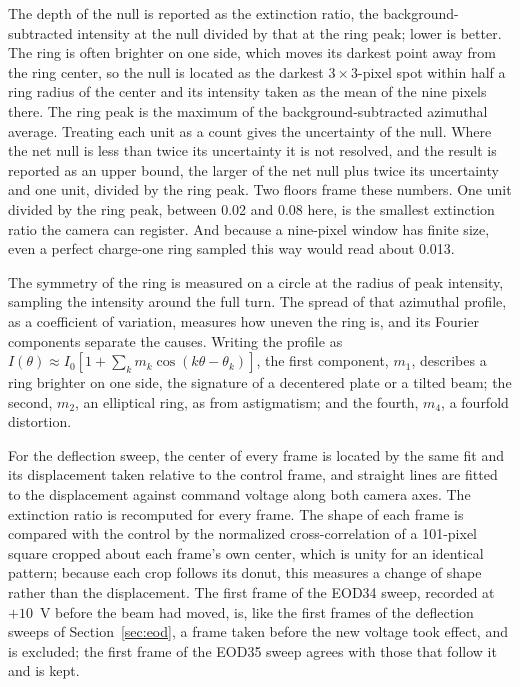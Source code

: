 \documentclass{article}
\begin{document}
The depth of the null is reported as the extinction ratio, the background-subtracted intensity at
the null divided by that at the ring peak; lower is better. The ring is often brighter on one side,
which moves its darkest point away from the ring center, so the null is located as the darkest
$3\times3$-pixel spot within half a ring radius of the center and its intensity taken as the mean of
the nine pixels there. The ring peak is the maximum of the background-subtracted azimuthal average.
Treating each unit as a count gives the uncertainty of the null. Where the net null is less than
twice its uncertainty it is not resolved, and the result is reported as an upper bound, the larger
of the net null plus twice its uncertainty and one unit, divided by the ring peak. Two floors frame
these numbers. One unit divided by the ring peak, between 0.02 and 0.08 here, is the smallest
extinction ratio the camera can register. And because a nine-pixel window has finite size, even a
perfect charge-one ring sampled this way would read about 0.013.

The symmetry of the ring is measured on a circle at the radius of peak intensity, sampling the
intensity around the full turn. The spread of that azimuthal profile, as a coefficient of variation,
measures how uneven the ring is, and its Fourier components separate the causes. Writing the profile
as $I(\theta)\approx I_0\left[1+\sum_k m_k\cos(k\theta-\theta_k)\right]$, the first component,
$m_1$, describes a ring brighter on one side, the signature of a decentered plate or a tilted beam;
the second, $m_2$, an elliptical ring, as from astigmatism; and the fourth, $m_4$, a fourfold
distortion.

For the deflection sweep, the center of every frame is located by the same fit and its displacement
taken relative to the control frame, and straight lines are fitted to the displacement against
command voltage along both camera axes. The extinction ratio is recomputed for every frame. The
shape of each frame is compared with the control by the normalized cross-correlation of a
101-pixel square cropped about each frame's own center, which is unity for an identical pattern;
because each crop follows its donut, this measures a change of shape rather than the displacement.
The first frame of the EOD34 sweep, recorded at $+10$~V before the beam had moved, is, like the
first frames of the deflection sweeps of Section~\ref{sec:eod}, a frame taken before the new
voltage took effect, and is excluded; the first
frame of the EOD35 sweep agrees with those that follow it and is kept.
\end{document}
